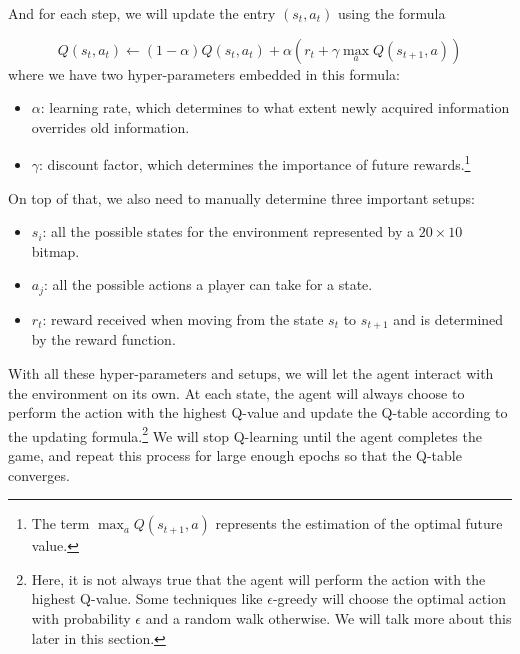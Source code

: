 \documentclass[letterpaper]{article} %
\begin{document}
And for each step, we will update the entry $(s_{t}, a_{t})$ using the formula

\[
    Q(s_{t},a_{t}) \leftarrow (1-\alpha) Q(s_{t},a_{t}) + \alpha   \left ( r_{t} + \gamma  \max_{a}Q(s_{t+1}, a)\right ) 
\]
where we have two hyper-parameters embedded in this formula:
\begin{itemize}
  \item $\alpha$: learning rate, which determines to what extent newly acquired information overrides old information.
  \item $\gamma$: discount factor, which determines the importance of future rewards.\footnote{The term $\max_{a}Q(s_{t+1}, a) $ represents the estimation of the optimal future value.}
\end{itemize}

On top of that, we also need to manually determine three important setups:
\begin{itemize}
  \item $s_{i}$: all the possible states for the environment represented by a $20\times 10$ bitmap.
  \item $a_{j}$: all the possible actions a player can take for a state.
  \item $r_{t}$: reward received when moving from the state $s_{t}$ to $s_{t+1}$ and is determined by the reward function.
\end{itemize}

With all these hyper-parameters and setups, we will let the agent interact with the environment on its own. At each state, the agent will always choose to perform the action with the highest Q-value and update the Q-table according to the updating formula.\footnote{Here, it is not always true that the agent will perform the action with the highest Q-value. Some techniques like $\epsilon$-greedy will choose the optimal action with probability $\epsilon$ and a random walk otherwise. We will talk more about this later in this section.} We will stop Q-learning until the agent completes the game, and repeat this process for large enough epochs so that the Q-table converges.
\end{document}
